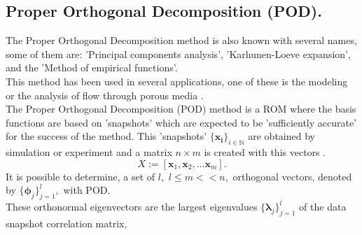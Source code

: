 \documentclass[a4paper,10pt]{report}
\begin{document}
\subsection*{Proper Orthogonal Decomposition (POD).}
The Proper Orthogonal Decomposition method is also known with several names, some of them are:
'Principal components analysis', 'Karhunen-Loeve expansion', and the 'Method of empirical functions'. \\
This method has been used in several applications, one of these is the modeling or the analysis of flow through 
porous media \cite{Gharbi97,Heijn03,Vermeulen04}.\\
The Proper Orthogonal Decomposition (POD) 
method is a ROM where the basis functions are based on 'snapshots'
which are expected to be 'sufficiently accurate' for the success of the method. This 'snapshots'
$\{ \mathbf{x_i}\} _{i\in \mathbb{N}}$ are obtained
by simulation or experiment and a matrix $n\times m$ is created with this vectors \cite{Mark06}.
\begin{equation}
X:=[\mathbf{x}_1,\mathbf{x}_2,...\mathbf{x}_m].
\end{equation}
It is possible to determine, a set of $l,$ $l\leq m << n,$ orthogonal vectors, denoted by $\{ \mathbf{\phi} _j \} ^l _{j=1},$ 
with POD. \\These orthonormal
eigenvectors are the largest eigenvalues $\{ \mathbf{\lambda} _j \} ^l _{j=1}$ of 
the data snapshot correlation matrix,
\end{document}
